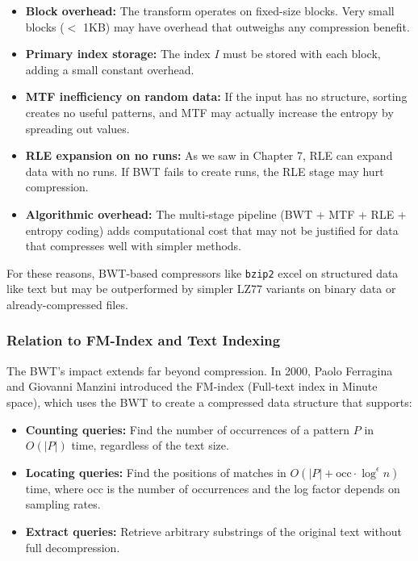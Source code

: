 \begin{itemize}
    \item \textbf{Block overhead:} The transform operates on fixed-size blocks. Very small blocks ($<$ 1KB) may have overhead that outweighs any compression benefit.
    
    \item \textbf{Primary index storage:} The index \(I\) must be stored with each block, adding a small constant overhead.
    
    \item \textbf{MTF inefficiency on random data:} If the input has no structure, sorting creates no useful patterns, and MTF may actually increase the entropy by spreading out values.
    
    \item \textbf{RLE expansion on no runs:} As we saw in Chapter 7, RLE can expand data with no runs. If BWT fails to create runs, the RLE stage may hurt compression.
    
    \item \textbf{Algorithmic overhead:} The multi-stage pipeline (BWT + MTF + RLE + entropy coding) adds computational cost that may not be justified for data that compresses well with simpler methods.
\end{itemize}

For these reasons, BWT-based compressors like \texttt{bzip2} excel on structured data like text but may be outperformed by simpler LZ77 variants on binary data or already-compressed files.

\subsubsection{Relation to FM-Index and Text Indexing}

The BWT's impact extends far beyond compression. In 2000, Paolo Ferragina and Giovanni Manzini introduced the FM-index (Full-text index in Minute space), which uses the BWT to create a compressed data structure that supports:

\begin{itemize}
    \item \textbf{Counting queries:} Find the number of occurrences of a pattern \(P\) in \(O(|P|)\) time, regardless of the text size.
    \item \textbf{Locating queries:} Find the positions of matches in \(O(|P| + \text{occ} \cdot \log^\epsilon n)\) time, where occ is the number of occurrences and the log factor depends on sampling rates.
    \item \textbf{Extract queries:} Retrieve arbitrary substrings of the original text without full decompression.
\end{itemize}

